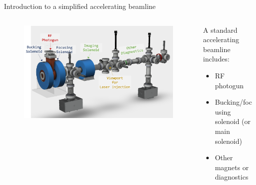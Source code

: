 \documentclass[aspectratio=169]{beamer}
\begin{document}
\begin{frame}{Introduction to a simplified accelerating beamline}
\begin{columns}
\begin{column}{0.6\textwidth}
    \begin{figure}
    \centering
        \includegraphics[width=1\textwidth]{beamline1_1.png}
    \end{figure}
\end{column}
\begin{column}{0.4\textwidth}
A standard accelerating beamline includes:
        \begin{itemize}
            \item RF photogun 
            \item Bucking/focusing solenoid (or main solenoid)
            \item Other magnets or diagnostics 
        \end{itemize}
\end{column}
\end{columns}
\end{frame}
\end{document}
